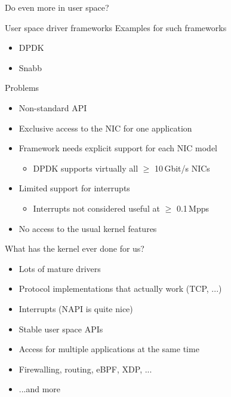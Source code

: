 \documentclass[NET,english,aspectratio=169,notitleframe]{tumbeamer}
\begin{document}
\begin{frame}{Do even more in user space?}
\centering
\end{frame}

\begin{frame}{User space driver frameworks}
Examples for such frameworks
\begin{itemize}
\item DPDK
\item Snabb
\end{itemize}
\end{frame}

\begin{frame}{Problems}
\begin{itemize}
\item Non-standard API
\item Exclusive access to the NIC for one application
\item Framework needs explicit support for each NIC model
\begin{itemize}
\item DPDK supports virtually all $\ge$ 10\,Gbit/s NICs
\end{itemize}
\item Limited support for interrupts
\begin{itemize}
\item Interrupts not considered useful at $\ge$ 0.1\,Mpps
\end{itemize}
\item No access to the usual kernel features
\end{itemize}
\end{frame}

\begin{frame}{What has the kernel ever done for us?}
\begin{itemize}
\item<1-> Lots of mature drivers
\item<2-> Protocol implementations that actually work (TCP, ...)
\item<3-> Interrupts (NAPI is quite nice)
\item<3-> Stable user space APIs
\item<3-> Access for multiple applications at the same time
\item<3-> Firewalling, routing, eBPF, XDP, ...
\item<3-> ...and more
\end{itemize}
\end{frame}
\end{document}
